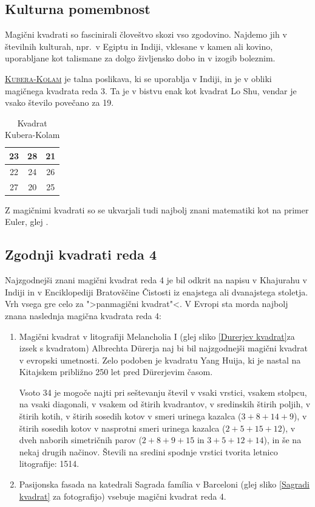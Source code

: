 \documentclass[a4paper,12pt]{article}
\newenvironment{magic}[3]
{
   \begin{table}[!ht]
      \centering
      \caption{#2}
      \label{#3}
      \large
      \begin{tabular}{#1}
         \hline 
}{
      \end{tabular}
      \normalsize
   \end{table}
}
\newcommand{\pojem}[1]{\underline{\textsc{#1}}}
\theoremstyle{definition}
\theoremstyle{definition}
\begin{document}

\subsection{Kulturna pomembnost}

Magični kvadrati so fascinirali človeštvo skozi vso zgodovino. Najdemo jih
v številnih kulturah, npr.\ v Egiptu in Indiji, vklesane v kamen ali
kovino, uporabljane kot talismane za dolgo življensko dobo in v
izogib boleznim.

\pojem{Kubera-Kolam} je talna poslikava, ki se uporablja v Indiji, in je v
obliki magičnega kvadrata reda 3. Ta je v bistvu enak kot kvadrat
Lo Shu, vendar je vsako število povečano za 19.

\begin{magic}{|c|c|c|}{Kvadrat Kubera-Kolam}{KvadKubera}
   23 & 28 & 21 \\\hline
   22 & 24 & 26 \\\hline
   27 & 20 & 25 \\\hline
\end{magic}

Z magičnimi kvadrati so se ukvarjali tudi najbolj znani matematiki kot na
primer Euler, glej \cite{euler}.


\subsection{Zgodnji kvadrati reda 4}

Najzgodnejši znani magični kvadrat reda 4 je bil odkrit na napisu
v Khajurahu v Indiji in v Enciklopediji Bratovščine Čistosti iz enajstega
ali dvanajstega stoletja. Vrh vsega gre celo za ">panmagični kvadrat"<.
V Evropi sta morda najbolj znana naslednja magična kvadrata reda 4:
\begin{enumerate}
   \item Magični kvadrat v litografiji Melancholia I (glej sliko 
   \ref{Durerjev kvadrat}za izsek s kvadratom) Albrechta Dürerja naj bi bil 
   najzgodnejši magični kvadrat v evropski umetnosti. Zelo podoben je kvadratu 
   Yang Huija, ki je nastal na Kitajskem približno 250 let pred Dürerjevim 
   časom.
   
   Vsoto 34 je mogoče najti pri seštevanju števil v vsaki vrstici, 
   vsakem stolpcu, na vsaki diagonali, v vsakem od štirih kvadrantov, 
   v sredinskih štirih poljih, v štirih kotih, v štirih sosedih kotov v smeri 
   urinega kazalca ($ 3 + 8 + 14 + 9 $), v štirih sosedih kotov v nasprotni 
   smeri urinega kazalca ($ 2 + 5 + 15 + 12 $), v dveh naborih simetričnih 
   parov ($ 2 + 8 + 9 + 15 $ in $ 3 +5 + 12 + 14 $), in še na nekaj drugih 
   načinov. Števili na sredini spodnje vrstici tvorita letnico 
   litografije: 1514.

   \item Pasijonska fasada na katedrali Sagrada família v Barceloni
   (glej sliko \ref{Sagradi kvadrat} za fotografijo) vsebuje magični kvadrat 
   reda 4.
\end{enumerate}
   
\end{document}
